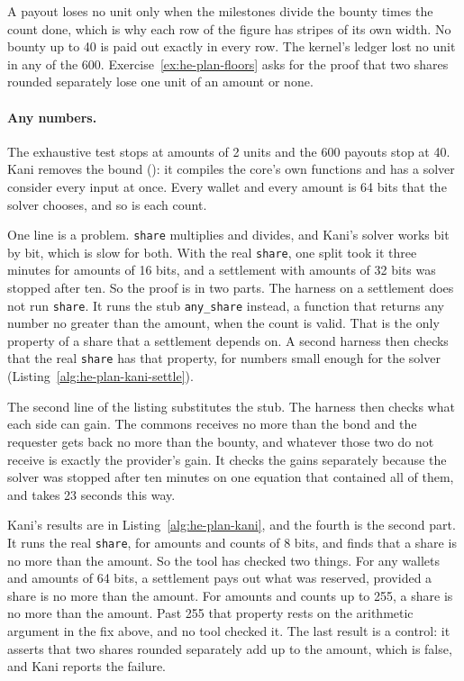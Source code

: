 A payout loses no unit only when the milestones divide the bounty times
the count done, which is why each row of the figure has stripes of its own
width. No bounty up to 40 is paid out exactly in every row. The kernel's
ledger lost no unit in any of the 600. Exercise~\ref{ex:he-plan-floors}
asks for the proof that two shares rounded separately lose one unit of an
amount or none.

\paragraph{Any numbers.}
The exhaustive test stops at amounts of 2 units and the 600 payouts stop
at 40. Kani removes the bound (): it
compiles the core's own functions and has a solver consider every input
at once. Every wallet and every amount is 64 bits that the solver chooses,
and so is each count.

One line is a problem. \texttt{share} multiplies and divides, and Kani's
solver works bit by bit, which is slow for both. With the real
\texttt{share}, one split took it three minutes for amounts of 16 bits,
and a settlement with amounts of 32 bits was stopped after ten. So the
proof is in two parts. The harness on a settlement does not run
\texttt{share}. It runs the stub \texttt{any\_share} instead, a function
that returns any number no greater than the amount, when the count is
valid. That is the only property of a share that a settlement depends on.
A second harness then checks that the real \texttt{share} has that
property, for numbers small enough for the solver
(Listing~\ref{alg:he-plan-kani-settle}).


The second line of the listing substitutes the stub. The harness then
checks what each side can gain. The commons receives no more than the bond
and the requester gets back no more than the bounty, and whatever those
two do not receive is exactly the provider's gain. It checks the gains
separately because the solver was stopped after ten minutes on one
equation that contained all of them, and takes 23 seconds this way.

Kani's results are in Listing~\ref{alg:he-plan-kani}, and the fourth is
the second part. It runs the real \texttt{share}, for amounts and counts
of 8 bits, and finds that a share is no more than the amount. So the tool
has checked two things. For any wallets and amounts of 64 bits, a
settlement pays out what was reserved, provided a share is no more than
the amount. For amounts and counts up to 255, a share is no more than the
amount. Past 255 that property rests on the arithmetic argument in the fix
above, and no tool checked it. The last result is a control: it asserts
that two shares rounded separately add up to the amount, which is false,
and Kani reports the failure.

